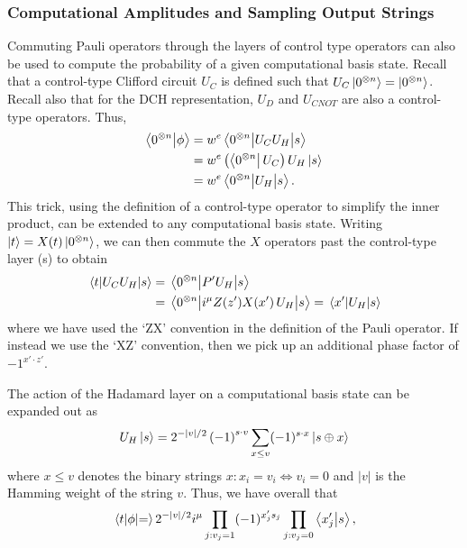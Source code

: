 \subsubsection*{Computational Amplitudes and Sampling Output Strings}
Commuting Pauli operators through the layers of control type operators can also be used to compute the probability of a given computational basis state. Recall that a control-type Clifford circuit $U_{C}$ is defined such that $U_{C}\ket{0^{\otimes n}}=\ket{0^{\otimes n}}$. Recall also that for the DCH representation, $U_{D}$ and $U_{CNOT}$ are also a control-type operators. Thus,
\begin{align*}
\braket{0^{\otimes n}}{\phi} &= w^{e}\matrixel{0^{\otimes n}}{U_{C}U_{H}}{s} \nonumber \\
&= w^{e}\left(\bra{0^{\otimes n}}U_{C}\right)U_{H}\ket{s} \nonumber \\
&= w^{e}\matrixel{0^{\otimes n}}{U_{H}}{s}.
\end{align*}
This trick, using the definition of a control-type operator to simplify the inner product, can be extended to any computational basis state. Writing $\ket{t}=X(t)\ket{0^{\otimes n}}$, we can then commute the $X$ operators past the control-type layer (s) to obtain
\begin{align}
\matrixel{t}{U_{C}U_{H}}{s} &= \matrixel{0^{\otimes n}}{P'U_{H}}{s} \nonumber \\
&= \matrixel{0^{\otimes n}}{i^{\mu}Z(z')X(x')\,U_{H}}{s} = \matrixel{x'}{U_{H}}{s}
\label{eq:arbitray_computational}
\end{align}
where we have used the `ZX' convention in the definition of the Pauli operator. If instead we use the `XZ' convention, then we pick up an additional phase factor of $-1^{x'\cdot z'}$.\par
The action of the Hadamard layer on a computational basis state can be expanded out as
\begin{equation}
U_{H}\ket{s}=2^{-\left\vert v\right\vert/2}\left(-1\right)^{s\cdot v}\sum_{x\leq v}(-1)^{s\cdot x}\ket{s \oplus x}
\label{eq:hadamard_action}
\end{equation}
where $x\leq v$ denotes the binary strings $x:x_{i}=v_{i}\iff v_{i}=0$ and $\left\vert v\right\vert$ is the Hamming weight of the string $v$. Thus, we have overall that
\begin{equation}
\matrixel{t}{\phi} = 2^{-\left\vert{v}\right\vert /2}i^{\mu}\prod_{j:v_{j}=1}(-1)^{x'_{j}s_{j}}\prod_{j:v_{j}=0}\braket{x'_{j}}{s},
\end{equation}
